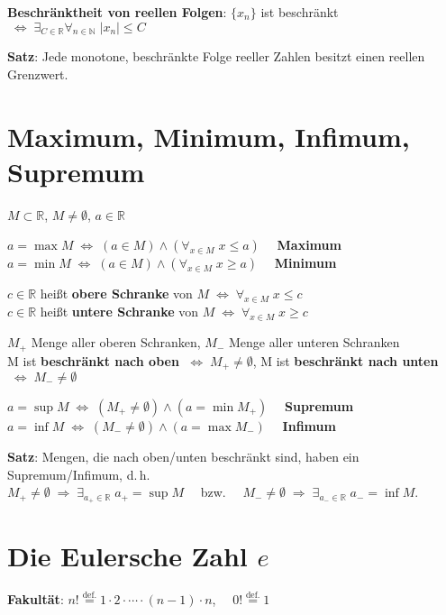 \textbf{Beschränktheit von reellen Folgen}: $\{x_n\}$ ist beschränkt
$\;\Leftrightarrow\;
\exists_{C \in \mathbb{R}} \forall_{n \in \mathbb{N}}\; |x_n| \le C$

\textbf{Satz}: Jede monotone, beschränkte Folge reeller Zahlen besitzt einen
reellen Grenzwert.

\section{%
    Maximum, Minimum, Infimum, Supremum%
}

$M \subset \mathbb{R}$, $M \not= \emptyset$, $a \in \mathbb{R}$

$a = \max{M} \;\Leftrightarrow\;
(a \in M) \land (\forall_{x \in M}\; x \le a) \quad$ \textbf{Maximum} \\
$a = \min{M} \;\Leftrightarrow\;
(a \in M) \land (\forall_{x \in M}\; x \ge a) \quad$ \textbf{Minimum}

$c \in \mathbb{R}$ heißt \textbf{obere Schranke} von
$M \;\Leftrightarrow\; \forall_{x \in M}\; x \le c$ \\
$c \in \mathbb{R}$ heißt \textbf{untere Schranke} von
$M \;\Leftrightarrow\; \forall_{x \in M}\; x \ge c$

$M_{+}$ Menge aller oberen Schranken, $M_{-}$ Menge aller unteren Schranken \\
M ist \textbf{beschränkt nach oben}
$\;\Leftrightarrow\; M_{+} \not= \emptyset$,
M ist \textbf{beschränkt nach unten}
$\;\Leftrightarrow\; M_{-} \not= \emptyset$

$a = \sup{M} \;\Leftrightarrow\;
(M_{+} \not= \emptyset) \land (a = \min{M_{+}}) \quad$ \textbf{Supremum} \\
$a = \inf{M} \;\Leftrightarrow\;
(M_{-} \not= \emptyset) \land (a = \max{M_{-}}) \quad$ \textbf{Infimum}

\textbf{Satz}: Mengen, die nach oben/unten beschränkt sind, haben ein
Supremum/Infimum, d.\,h. \\
$M_{+} \not= \emptyset \;\Rightarrow\;
\exists_{a_{+} \in \mathbb{R}}\; a_{+} = \sup{M}\quad $ bzw.
$\quad M_{-} \not= \emptyset \;\Rightarrow\;
\exists_{a_{-} \in \mathbb{R}}\; a_{-} = \inf{M}$.

\section{%
    \texorpdfstring{Die Eulersche Zahl $e$}{Die Eulersche Zahl ℯ}%
}

\textbf{Fakultät}: $n! \overset{\text{def.}}{=}
1 \cdot 2 \cdot \cdots \cdot (n-1) \cdot n$,
$\quad 0! \overset{\text{def.}}{=} 1$

